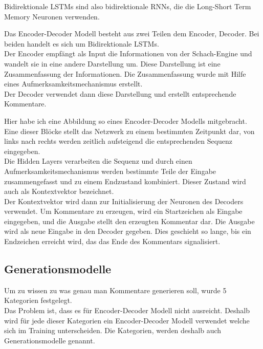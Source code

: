 Bidirektionale LSTMs sind also bidirektionale RNNs, die die Long-Short Term Memory Neuronen verwenden.

\newpage

Das Encoder-Decoder Modell besteht aus zwei Teilen dem Encoder, Decoder. Bei beiden handelt es sich um Bidirektionale LSTMs.\\

Der Encoder empfängt als Input die Informationen von der Schach-Engine und wandelt sie in eine andere Darstellung um. Diese Darstellung ist eine Zusammenfassung der Informationen. Die Zusammenfassung wurde mit Hilfe eines Aufmerksamkeitsmechanismus erstellt.\\

Der Decoder verwendet dann diese Darstellung und erstellt entsprechende Kommentare.

\newpage

Hier habe ich eine Abbildung so eines Encoder-Decoder Modells mitgebracht.\\

Eine dieser Blöcke stellt das Netzwerk zu einem bestimmten Zeitpunkt dar, von links nach rechts werden zeitlich aufsteigend die entsprechenden Sequenz eingegeben.\\

Die Hidden Layers verarbeiten die Sequenz und durch einen Aufmerksamkeitsmechanismus werden bestimmte Teile der Eingabe zusammengefasst und zu einem Endzustand kombiniert. Dieser Zustand wird auch als Kontextvektor bezeichnet.\\

Der Kontextvektor wird dann zur Initialisierung der Neuronen des Decoders verwendet. Um Kommentare zu erzeugen, wird ein Startzeichen als Eingabe eingegeben, und die Ausgabe stellt den erzeugten Kommentar dar. Die Ausgabe wird als neue Eingabe in den Decoder gegeben. Dies geschieht so lange, bis ein Endzeichen erreicht wird, das das Ende des Kommentars signalisiert.

\newpage

\subsection{Generationsmodelle}

Um zu wissen zu was genau man Kommentare generieren soll, wurde 5 Kategorien festgelegt.\\

Das Problem ist, dass es für Encoder-Decoder Modell nicht ausreicht. Deshalb wird für jede dieser Kategorien ein Encoder-Decoder Modell verwendet welche sich im Training unterscheiden. Die Kategorien, werden deshalb auch Generationsmodelle genannt.\\

